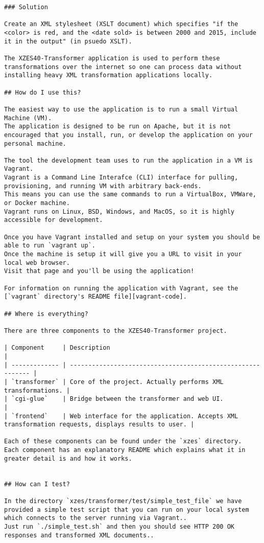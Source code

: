 \begin{lstlisting}[caption={XZES40-Transformer project REDME}]
### Solution

Create an XML stylesheet (XSLT document) which specifies "if the <color> is red, and the <date sold> is between 2000 and 2015, include it in the output" (in psuedo XSLT).

The XZES40-Transformer application is used to perform these transformations over the internet so one can process data without installing heavy XML transformation applications locally.

## How do I use this?

The easiest way to use the application is to run a small Virtual Machine (VM).
The application is designed to be run on Apache, but it is not encouraged that you install, run, or develop the application on your personal machine.

The tool the development team uses to run the application in a VM is Vagrant.
Vagrant is a Command Line Interafce (CLI) interface for pulling, provisioning, and running VM with arbitrary back-ends.
This means you can use the same commands to run a VirtualBox, VMWare, or Docker machine.
Vagrant runs on Linux, BSD, Windows, and MacOS, so it is highly accessible for development.

Once you have Vagrant installed and setup on your system you should be able to run `vagrant up`.
Once the machine is setup it will give you a URL to visit in your local web browser.
Visit that page and you'll be using the application!

For information on running the application with Vagrant, see the [`vagrant` directory's README file][vagrant-code].

## Where is everything?

There are three components to the XZES40-Transformer project.

| Component     | Description                                                 |
| ------------- | ----------------------------------------------------------- |
| `transformer` | Core of the project. Actually performs XML transformations. |
| `cgi-glue`    | Bridge between the transformer and web UI.                  |
| `frontend`    | Web interface for the application. Accepts XML transformation requests, displays results to user. |

Each of these components can be found under the `xzes` directory.
Each component has an explanatory README which explains what it in greater detail is and how it works.


## How can I test?

In the directory `xzes/transformer/test/simple_test_file` we have provided a simple test script that you can run on your local system which connects to the server running via Vagrant..
Just run `./simple_test.sh` and then you should see HTTP 200 OK responses and transformed XML documents..


\end{lstlisting}
